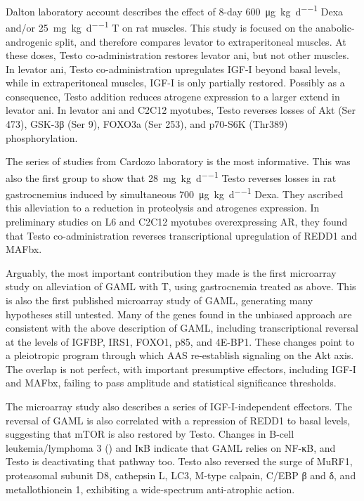 \documentclass[12pt,english]{report}\usepackage[]{graphicx}\usepackage[]{color}
\begin{document}
Dalton laboratory account describes the effect of 8-day \SI{600}{\micro\gram\per\kilo\gram\per\day}
Dexa and/or \SI{25}{\milli\gram\per\kilo\gram\per\day} T\citep{jones2010effects}
on rat muscles. This study is focused on the anabolic-androgenic split,
and therefore compares levator to extraperitoneal muscles. At these
doses, Testo co-administration restores levator ani, but not other
muscles. In levator ani, Testo co-administration upregulates IGF-I
beyond basal levels, while in extraperitoneal muscles, IGF-I is only
partially restored. Possibly as a consequence, Testo addition reduces
atrogene expression to a larger extend in levator ani. In levator
ani and C2C12 myotubes, Testo reverses losses of Akt (Ser 473), GSK-3β
(Ser 9), FOXO3a (Ser 253), and p70-S6K (Thr389) phosphorylation.

The series of studies from Cardozo laboratory is the most informative.
This was also the first group to show that \SI{28}{\milli\gram\per\kilo\gram\per\day}
Testo reverses losses in rat gastrocnemius induced by simultaneous
\SI{700}{\micro\gram\per\kilo\gram\per\day} Dexa\citep{zhao2008testosterone}.
They ascribed this alleviation to a reduction in proteolysis and atrogenes
expression. In preliminary studies on L6 and C2C12 myotubes overexpressing
AR, they found that Testo co-administration reverses transcriptional
upregulation of REDD1 and MAFbx\citep{zhao2008expression,wu2010redd1}.

Arguably, the most important contribution they made is the first microarray
study on alleviation of GAML with T\citep{wu2010redd1}, using gastrocnemia
treated as above. This is also the first published microarray study
of GAML, generating many hypotheses still untested. Many of the genes
found in the unbiased approach are consistent with the above description
of GAML, including transcriptional reversal at the levels of IGFBP,
IRS1, FOXO1, p85, and 4E-BP1. These changes point to a pleiotropic
program through which AAS re-establish signaling on the Akt axis.
The overlap is not perfect, with important presumptive effectors,
including IGF-I and MAFbx, failing to pass amplitude and statistical
significance thresholds.

The microarray study also describes a series of IGF-I-independent
effectors. The reversal of GAML is also correlated with a repression
of REDD1 to basal levels, suggesting that mTOR is also restored by
Testo. Changes in B-cell leukemia/lymphoma 3 ()
and IκB indicate that GAML relies on NF-κB, and Testo is deactivating
that pathway too. Testo also reversed the surge of MuRF1, proteasomal
subunit D8, cathepsin L, LC3, M-type calpain, C/EBP β and δ, and metallothionein
1, exhibiting a wide-spectrum anti-atrophic action.
\end{document}
